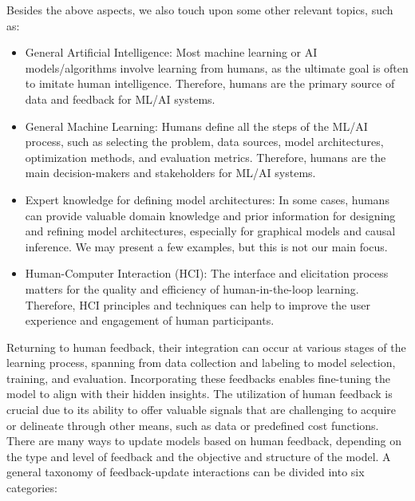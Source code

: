 \documentclass[
  letterpaper,
  DIV=11,
  numbers=noendperiod,
  oneside]{scrreprt}
\theoremstyle{remark}
\begin{document}
Besides the above aspects, we also touch upon some other relevant
topics, such as:

\begin{itemize}
\item
  General Artificial Intelligence: Most machine learning or AI
  models/algorithms involve learning from humans, as the ultimate goal
  is often to imitate human intelligence. Therefore, humans are the
  primary source of data and feedback for ML/AI systems.
\item
  General Machine Learning: Humans define all the steps of the ML/AI
  process, such as selecting the problem, data sources, model
  architectures, optimization methods, and evaluation metrics.
  Therefore, humans are the main decision-makers and stakeholders for
  ML/AI systems.
\item
  Expert knowledge for defining model architectures: In some cases,
  humans can provide valuable domain knowledge and prior information for
  designing and refining model architectures, especially for graphical
  models and causal inference. We may present a few examples, but this
  is not our main focus.
\item
  Human-Computer Interaction (HCI): The interface and elicitation
  process matters for the quality and efficiency of human-in-the-loop
  learning. Therefore, HCI principles and techniques can help to improve
  the user experience and engagement of human participants.
\end{itemize}

Returning to human feedback, their integration can occur at various
stages of the learning process, spanning from data collection and
labeling to model selection, training, and evaluation. Incorporating
these feedbacks enables fine-tuning the model to align with their hidden
insights. The utilization of human feedback is crucial due to its
ability to offer valuable signals that are challenging to acquire or
delineate through other means, such as data or predefined cost
functions. There are many ways to update models based on human feedback,
depending on the type and level of feedback and the objective and
structure of the model. A general taxonomy of feedback-update
interactions can be divided into six categories:
\end{document}
